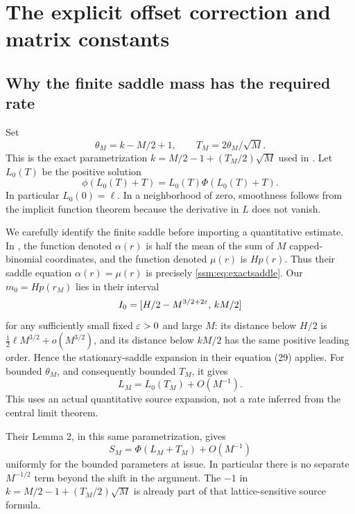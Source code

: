 \section{The explicit offset correction and matrix constants}\label{ssm:sec:explicit}
\subsection{Why the finite saddle mass has the required rate}
Set
\[
 \theta_M=k-M/2+1,\qquad T_M=2\theta_M/\sqrt M.
\]
This is the exact parametrization $k=M/2-1+(T_M/2)\sqrt M$ used in \cite{mww}. Let $L_0(T)$ be the positive solution
\begin{equation}\label{ssm:eq:Lzero}
 \phi(L_0(T)+T)=L_0(T)\Phi(L_0(T)+T).
\end{equation}
In particular $L_0(0)=\ell$. In a neighborhood of zero, smoothness follows from the implicit function theorem because the derivative in $L$ does not vanish.

We carefully identify the finite saddle before importing a quantitative estimate. In \cite[Section 6]{mww}, the function denoted $\alpha(r)$ is half the mean of the sum of $M$ capped-binomial coordinates, and the function denoted $\mu(r)$ is $Hp(r)$. Thus their saddle equation $\alpha(r)=\mu(r)$ is precisely \eqref{ssm:eq:exactsaddle}. Our $m_0=Hp(r_M)$ lies in their interval
\[
 I_0=[H/2-M^{3/2+2\varepsilon},\,kM/2]
\]
for any sufficiently small fixed $\varepsilon>0$ and large $M$: its distance below $H/2$ is $\tfrac12\ell M^{3/2}+o(M^{3/2})$, and its distance below $kM/2$ has the same positive leading order. Hence the stationary-saddle expansion in their equation (29) applies. For bounded $\theta_M$, and consequently bounded $T_M$, it gives
\begin{equation}\label{ssm:eq:sourceLrate}
 L_M=L_0(T_M)+O(M^{-1}).
\end{equation}
This uses an actual quantitative source expansion, not a rate inferred from the central limit theorem.

Their Lemma 2, in this same parametrization, gives
\begin{equation}\label{ssm:eq:sourceSrate}
 S_M=\Phi(L_M+T_M)+O(M^{-1})
\end{equation}
uniformly for the bounded parameters at issue. In particular there is no separate $M^{-1/2}$ term beyond the shift in the argument. The $-1$ in $k=M/2-1+(T_M/2)\sqrt M$ is already part of that lattice-sensitive source formula.

